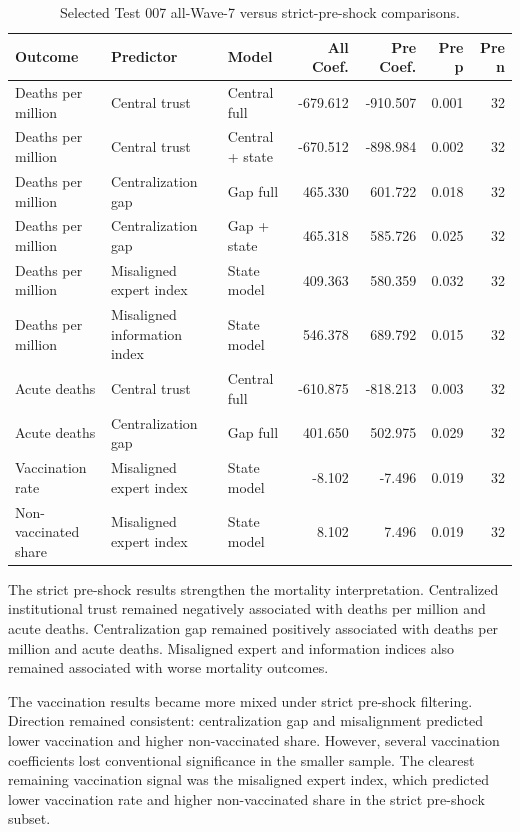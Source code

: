 \documentclass[12pt]{article}
\begin{document}
\begin{table}[htbp]
\centering
\small
\caption{Selected Test 007 all-Wave-7 versus strict-pre-shock comparisons.}
\begin{tabular}{lllrrrr}
\toprule
Outcome & Predictor & Model & All Coef. & Pre Coef. & Pre p & Pre n \\
\midrule
Deaths per million & Central trust & Central full & -679.612 & -910.507 & 0.001 & 32 \\
Deaths per million & Central trust & Central + state & -670.512 & -898.984 & 0.002 & 32 \\
Deaths per million & Centralization gap & Gap full & 465.330 & 601.722 & 0.018 & 32 \\
Deaths per million & Centralization gap & Gap + state & 465.318 & 585.726 & 0.025 & 32 \\
Deaths per million & Misaligned expert index & State model & 409.363 & 580.359 & 0.032 & 32 \\
Deaths per million & Misaligned information index & State model & 546.378 & 689.792 & 0.015 & 32 \\
Acute deaths & Central trust & Central full & -610.875 & -818.213 & 0.003 & 32 \\
Acute deaths & Centralization gap & Gap full & 401.650 & 502.975 & 0.029 & 32 \\
Vaccination rate & Misaligned expert index & State model & -8.102 & -7.496 & 0.019 & 32 \\
Non-vaccinated share & Misaligned expert index & State model & 8.102 & 7.496 & 0.019 & 32 \\
\bottomrule
\end{tabular}
\end{table}

The strict pre-shock results strengthen the mortality interpretation. Centralized institutional trust remained negatively associated with deaths per million and acute deaths. Centralization gap remained positively associated with deaths per million and acute deaths. Misaligned expert and information indices also remained associated with worse mortality outcomes.

The vaccination results became more mixed under strict pre-shock filtering. Direction remained consistent: centralization gap and misalignment predicted lower vaccination and higher non-vaccinated share. However, several vaccination coefficients lost conventional significance in the smaller sample. The clearest remaining vaccination signal was the misaligned expert index, which predicted lower vaccination rate and higher non-vaccinated share in the strict pre-shock subset.
\end{document}

